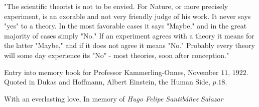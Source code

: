 \begin{dedicatoria}

  "The scientific theorist is not to be envied. For Nature, or more precisely experiment, is an exorable and not very friendly judge of his work. It never says "yes" to a theory. In the most favorable cases it says "Maybe," and in the great majority of cases simply "No." If an experiment agrees with a theory it means for the latter "Maybe," and if it does not agree it means "No." Probably every theory will some day experience its "No" - most theories, soon after conception."


\vspace{1.0cm}
\begin{flushright}
Entry into memory book for Professor Kammerling-Onnes, November $11$, $1922$.\\
Quoted in Dukas and Hoffmann, Albert Einstein, the Human Side, $p.18$.
\end{flushright}

\vspace{13.0cm}
\begin{flushright}
	With an everlasting love, In memory of \emph{Hugo Felipe Santibáñez Salazar}
\end{flushright}
	
\end{dedicatoria}
